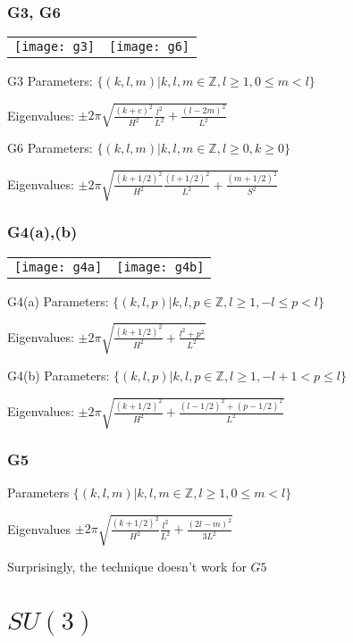\documentclass{beamer}
\def\Z{{\mathbb Z}}
\begin{document}
\begin{frame}
	\frametitle{G3, G6}
		\begin{tabular}[]{lr}
\texttt{[image: g3]} & \texttt{[image: g6]}\\
		\end{tabular}
		\begin{block}{G3}
			Parameters: $\{(k,l,m)| k,l,m \in \Z, l \geq 1, 0 \leq m < l\}$

			Eigenvalues: $\pm 2\pi\sqrt{\frac{(k+c)^2}{H^2}\frac{l^2}{L^2} + \frac{(l - 2m)^2}{L^2}}$
		\end{block}
		\begin{block}{G6}
			Parameters: $\{(k,l,m)| k,l,m \in \Z, l \geq 0, k\geq 0\}$

			Eigenvalues: $\pm 2\pi\sqrt{\frac{(k+1/2)^2}{H^2}\frac{(l+1/2)^2}{L^2} + \frac{(m + 1/2)^2}{S^2}}$
		\end{block}
\end{frame}

\begin{frame}
	\frametitle{G4(a),(b)}
		\begin{tabular}[]{lr}
\texttt{[image: g4a]} & \texttt{[image: g4b]}\\
		\end{tabular}
		\begin{block}{G4(a)}
			Parameters: $\{(k,l,p)| k,l,p \in \Z, l \geq 1, -l \leq p < l\}$

			Eigenvalues: $\pm 2\pi\sqrt{\frac{(k+1/2)^2}{H^2} + \frac{l^2 + p^2}{L^2}}$
		\end{block}
		\begin{block}{G4(b)}
			Parameters: $\{(k,l,p)| k,l,p \in \Z, l \geq 1, -l + 1 < p \leq l\}$

			Eigenvalues: $\pm 2\pi\sqrt{\frac{(k+1/2)^2}{H^2} + \frac{(l-1/2)^2 + (p - 1/2)^2}{L^2}}$
		\end{block}
\end{frame}

\begin{frame}
	\frametitle{G5}
	\begin{block}{Parameters}
		$\{(k,l,m)| k,l,m \in \Z, l \geq 1, 0 \leq m < l\}$
	\end{block}

	\begin{block}{Eigenvalues}
		$\pm 2\pi\sqrt{\frac{(k+1/2)^2}{H^2}\frac{l^2}{L^2} + \frac{(2l- m)^2}{3L^2}}$
	\end{block}

	\pause

	\begin{block}{}
		Surprisingly, the technique doesn't work for $G5$
	\end{block}
\end{frame}

\section{$SU(3)$}
\end{document}
